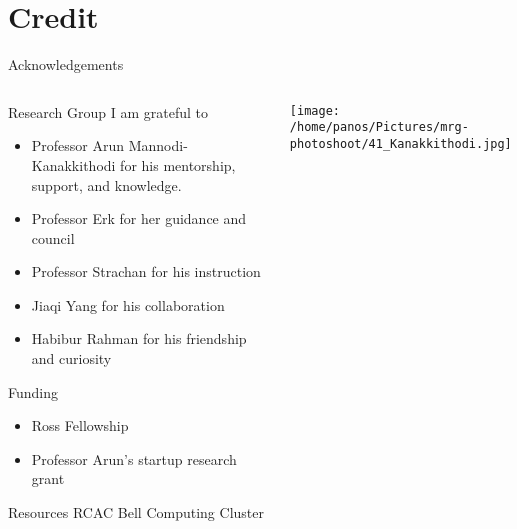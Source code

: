 \documentclass[10pt, aspectratio=169, presentation]{beamer}
\begin{document}
\section{Credit}
\label{sec:orgdaee5ac}
\begin{frame}[label={sec:org41869d9}]{Acknowledgements}
\begin{columns}
\begin{column}{0.6\columnwidth}
\begin{block}{Research Group}
I am grateful to
\begin{itemize}
\item Professor Arun Mannodi-Kanakkithodi for his mentorship, support, and knowledge.
\item Professor Erk for her guidance and council
\item Professor Strachan for his instruction
\item Jiaqi Yang for his collaboration
\item Habibur Rahman for his friendship and curiosity
\end{itemize}
\end{block}
\begin{block}{Funding}
\begin{itemize}
\item Ross Fellowship
\item Professor Arun's startup research grant
\end{itemize}
\end{block}
\begin{block}{Resources}
RCAC Bell Computing Cluster
\end{block}
\end{column}
\begin{column}{0.4\columnwidth}
\hspace*{-1cm}
\texttt{[image: /home/panos/Pictures/mrg-photoshoot/41\_Kanakkithodi.jpg]}
\end{column}
\end{columns}
\end{frame}
\end{document}
